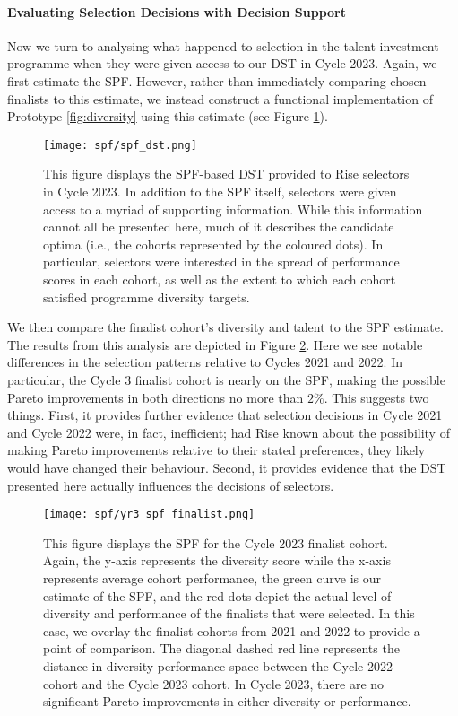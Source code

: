 \paragraph{Evaluating Selection Decisions with Decision Support}
Now we turn to analysing what happened to selection in the talent investment programme when they were given access to our DST in Cycle 2023. Again, we first estimate the SPF. However, rather than immediately comparing chosen finalists to this estimate, we instead construct a functional implementation of Prototype \ref{fig:diversity} using this estimate (see Figure \ref{fig:spf_dst}).

\begin{figure}[htbp]
    \centering
    \caption{This figure displays the SPF-based DST provided to Rise selectors in Cycle 2023. In addition to the SPF itself, selectors were given access to a myriad of supporting information. While this information cannot all be presented here, much of it describes the candidate optima (i.e., the cohorts represented by the coloured dots). In particular, selectors were interested in the spread of performance scores in each cohort, as well as the extent to which each cohort satisfied programme diversity targets.}
    \label{fig:spf_dst}
    \texttt{[image: spf/spf\_dst.png]} 
\end{figure}

\noindent We then compare the finalist cohort's diversity and talent to the SPF estimate. The results from this analysis are depicted in Figure \ref{fig:spf_2023}. Here we see notable differences in the selection patterns relative to Cycles 2021 and 2022. In particular, the Cycle 3 finalist cohort is nearly on the SPF, making the possible Pareto improvements in both directions no more than $2\%$. This suggests two things. First, it provides further evidence that selection decisions in Cycle 2021 and Cycle 2022 were, in fact, inefficient; had Rise known about the possibility of making Pareto improvements relative to their stated preferences, they likely would have changed their behaviour. Second, it provides evidence that the DST presented here actually influences the decisions of selectors. 

\begin{figure}[!htb]
    \centering
    \caption{This figure displays the SPF for the Cycle 2023 finalist cohort. Again, the y-axis represents the diversity score while the x-axis represents average cohort performance, the green curve is our estimate of the SPF, and the red dots depict the actual level of diversity and performance of the finalists that were selected. In this case, we overlay the finalist cohorts from 2021 and 2022 to provide a point of comparison. The diagonal dashed red line represents the distance in diversity-performance space between the Cycle 2022 cohort and the Cycle 2023 cohort. In Cycle 2023, there are no significant Pareto improvements in either diversity or performance.} 
    \label{fig:spf_2023}
    \texttt{[image: spf/yr3\_spf\_finalist.png]}
\end{figure}

